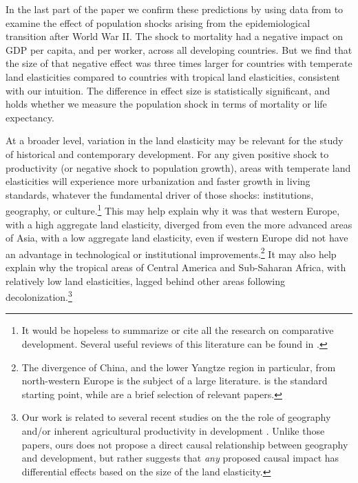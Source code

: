 \documentclass[11pt]{article}
\begin{document}
In the last part of the paper we confirm these predictions by using data from \cite{aj07} to examine the effect of population shocks arising from the epidemiological transition after World War II. The shock to mortality had a negative impact on GDP per capita, and per worker, across all developing countries. But we find that the size of that negative effect was three times larger for countries with temperate land elasticities compared to countries with tropical land elasticities, consistent with our intuition. The difference in effect size is statistically significant, and holds whether we measure the population shock in terms of mortality or life expectancy.

At a broader level, variation in the land elasticity may be relevant for the study of historical and contemporary development. For any given positive shock to productivity (or negative shock to population growth), areas with temperate land elasticities will experience more urbanization and faster growth in living standards, whatever the fundamental driver of those shocks: institutions, geography, or culture.\footnote{It would be hopeless to summarize or cite all the research on comparative development. Several useful reviews of this literature can be found in \cite{ajr2005handbook,nunn_2009,Galor:2011uq,sw2013,vries2013}.} This may help explain why it was that western Europe, with a high aggregate land elasticity, diverged from even the more advanced areas of Asia, with a low aggregate land elasticity, even if western Europe did not have an advantage in technological or institutional improvements.\footnote{The divergence of China, and the lower Yangtze region in particular, from north-western Europe is the subject of a large literature. \citet{pom2000} is the standard starting point, while \citet{allen11,huang2002,ma2013,lee2002,bg2006} are a brief selection of relevant papers.} It may also help explain why the tropical areas of Central America and Sub-Saharan Africa, with relatively low land elasticities, lagged behind other areas following decolonization.\footnote{Our work is related to several recent studies on the the role of geography and/or inherent agricultural productivity in development \citep{oh2005,ashraf2010dynamics,Nunn2011,Nunn2012,mich2012,agn2013,cook14,cook2014role,fenske2014,alsan2015,ashrafmich2015,dks2015,galorozak2016,litina2016,ads2016,FrankemaPap2017}. Unlike those papers, ours does not propose a direct causal relationship between geography and development, but rather suggests that \textit{any} proposed causal impact has differential effects based on the size of the land elasticity.} 
\end{document}
